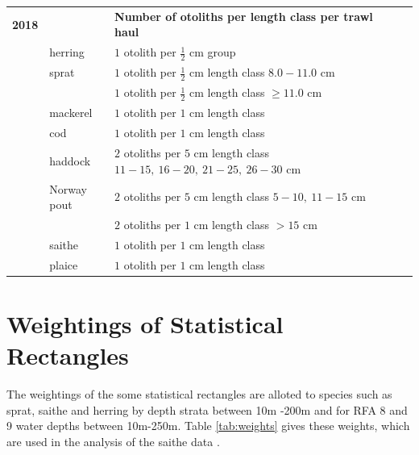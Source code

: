 \documentclass[a4paper 12pt]{article}
\numberwithin{equation}{section}
\begin{document}
\begin{small}
\begin{table}[h!]
\begin{tabularx}{\linewidth}{r l l l l X}
{\bf 2018} & & {\bf Number of otoliths per length class per trawl haul}  \\[1.0ex]
  & herring  &  $1$  otolith per $\frac{1}{2}$ cm group \\[0.5ex]
     & sprat    & $1$  otolith per $\frac{1}{2}$ cm length class  $8.0 -11.0$ cm\\[0.5ex]
              & & $1$  otolith per $\frac{1}{2}$ cm length class  $\geq 11.0$ cm\\[0.5ex]
& mackerel      & $1$  otolith per $1$ cm length class \\[0.5ex]
& cod       	  & $1$  otolith per $1$ cm length class\\[0.5ex]
& haddock & $2$  otoliths per $5$ cm length class $11 -15, \ 16-20, \ 21-25, \ 26-30$ cm \\[0.5ex]
& Norway pout & $2$  otoliths per $5$ cm length class $5 -10, \ 11-15$ cm\\[0.5ex]
               & & $2$  otoliths per $1$ cm length class $> 15$ cm\\[1.0ex]
&saithe        & $1$  otolith per $1$ cm length class \\[0.5ex]  
&plaice       & $1$  otolith per $1$ cm length class \\[0.1ex]
\bottomrule         
\end{tabularx}
\end{table}
\end{small}

 \section{\large Weightings of Statistical Rectangles}
 \label{secAp:weightings}
 
 The weightings of the some statistical rectangles are alloted to species such as sprat, saithe and herring by depth strata between 10m -200m and for RFA 8 and 9 water depths between 10m-250m. Table \ref{tab:weights} gives these weights, which are used in the analysis of the saithe data \citep{ICES2013}.\\
 
\end{document}
